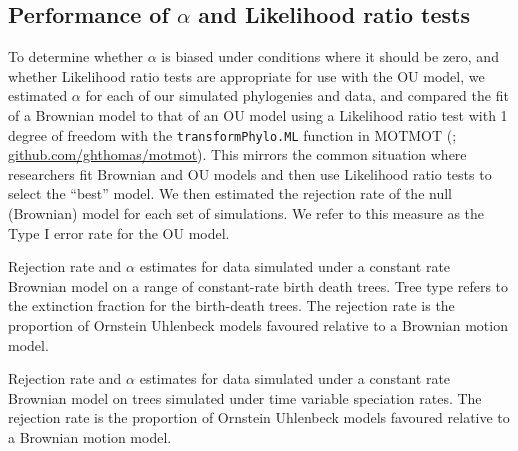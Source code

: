 \documentclass[a4paper,12pt]{article}
\begin{document}
  \subsection{Performance of $\alpha$ and Likelihood ratio tests}
    To determine whether $\alpha$ is biased under conditions where it should be zero, and whether Likelihood ratio tests are appropriate for use with the OU model, we estimated $\alpha$ for each of our simulated phylogenies and data, and compared the fit of a Brownian model to that of an OU model using a Likelihood ratio test with 1 degree of freedom with the \texttt{transformPhylo.ML} function in MOTMOT (\citealp{Thomas:2011aa}; \href{https://github.com/ghthomas/motmot}{github.com/ghthomas/motmot}). 
    This mirrors the common situation where researchers fit Brownian and OU models and then use Likelihood ratio tests to select the ``best'' model.
    We then estimated the rejection rate of the null (Brownian) model for each set of simulations. 
    We refer to this measure as the Type I error rate for the OU model.

      \begin{table}[!htbp]
        \begin{center}
        \caption{Rejection rate and $\alpha$ estimates for data simulated under a constant rate Brownian model on a range of constant-rate birth death trees. Tree type refers to the extinction fraction for the birth-death trees. The rejection rate is the proportion of Ornstein Uhlenbeck models favoured relative to a Brownian motion model.}
        \bigskip
        
        \label{tables:bd_noerror}
        \end{center}
\end{table} 

      \begin{table}[!htbp]
        \begin{center}
        \caption{Rejection rate and $\alpha$ estimates for data simulated under a constant rate Brownian model on trees simulated under time variable speciation rates. The rejection rate is the proportion of Ornstein Uhlenbeck models favoured relative to a Brownian motion model.}
        \bigskip
        
        \label{tables:varrate_noerror}
        \end{center}
\end{table} 
\end{document}
